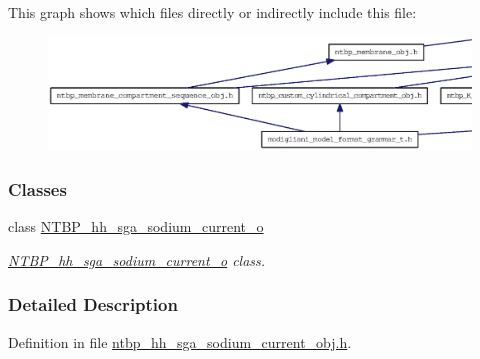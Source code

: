 This graph shows which files directly or indirectly include this file:
\nopagebreak
\begin{figure}[H]
\begin{center}
\leavevmode
\includegraphics[width=400pt]{ntbp__hh__sga__sodium__current__obj_8h__dep__incl}
\end{center}
\end{figure}
\subsubsection*{Classes}
\begin{DoxyCompactItemize}
\item 
class \hyperlink{class_n_t_b_p__hh__sga__sodium__current__o}{NTBP\_\-hh\_\-sga\_\-sodium\_\-current\_\-o}
\begin{DoxyCompactList}\small\item\em \hyperlink{class_n_t_b_p__hh__sga__sodium__current__o}{NTBP\_\-hh\_\-sga\_\-sodium\_\-current\_\-o} class. \item\end{DoxyCompactList}\end{DoxyCompactItemize}


\subsubsection{Detailed Description}


Definition in file \hyperlink{ntbp__hh__sga__sodium__current__obj_8h_source}{ntbp\_\-hh\_\-sga\_\-sodium\_\-current\_\-obj.h}.

